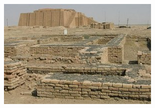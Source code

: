 \vfill
\pagebreak

\begin{center}
	\includegraphics[width=\linewidth]{./IMG/ruinas_cidade_ur.jpg}
\end{center}

